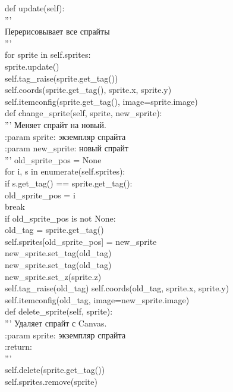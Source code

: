 def update(self):\\
'''\\
Перерисовывает все спрайты\\

'''\\
for sprite in self.sprites:\\
sprite.update()\\
self.tag\_raise(sprite.get\_tag())\\
self.coords(sprite.get\_tag(), sprite.x, sprite.y)\\
self.itemconfig(sprite.get\_tag(), image=sprite.image)\\


def change\_sprite(self, sprite, new\_sprite):\\
'''
Меняет  спрайт на новый.\\

:param sprite: экземпляр спрайта\\
:param new\_sprite: новый спрайт\\
'''
old\_sprite\_pos = None\\
for i, s in enumerate(self.sprites):\\
if s.get\_tag() == sprite.get\_tag():\\
old\_sprite\_pos = i\\
break\\

if old\_sprite\_pos is not None:\\
old\_tag = sprite.get\_tag()\\

self.sprites[old\_sprite\_pos] = new\_sprite\\
new\_sprite.set\_tag(old\_tag)\\

new\_sprite.set\_tag(old\_tag)\\
new\_sprite.set\_z(sprite.z)\\

self.tag\_raise(old\_tag)
self.coords(old\_tag, sprite.x, sprite.y)\\
self.itemconfig(old\_tag, image=new\_sprite.image)\\

def delete\_sprite(self, sprite):\\
'''
Удаляет спрайт с Canvas.\\

:param sprite: экземпляр спрайта\\
:return:\\
'''\\
self.delete(sprite.get\_tag())\\
self.sprites.remove(sprite)\\

